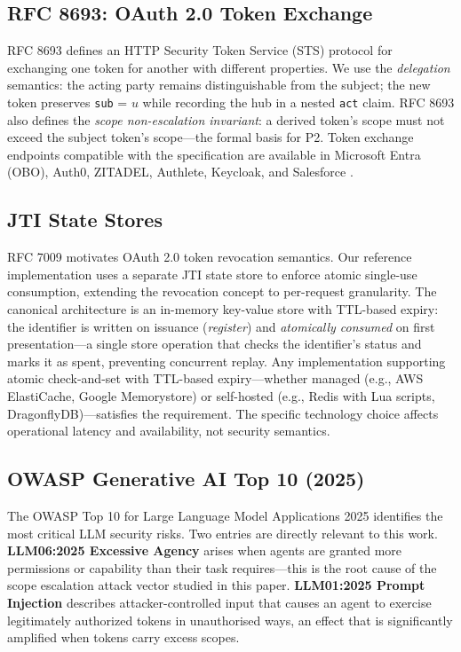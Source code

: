 \documentclass[journal]{IEEEtran}
\theoremstyle{definition}
\begin{document}
\subsection{RFC 8693: OAuth 2.0 Token Exchange}

RFC 8693 \cite{rfc8693} defines an HTTP Security Token Service (STS) protocol
for exchanging one token for another with different properties.
We use the \textit{delegation} semantics: the acting party remains
distinguishable from the subject; the new token preserves \texttt{sub} = $u$
while recording the hub in a nested \texttt{act} claim. RFC 8693 also defines
the \textit{scope non-escalation invariant}: a derived token's scope must not
exceed the subject token's scope---the formal basis for P2. Token exchange endpoints compatible with the specification are available in
Microsoft Entra (OBO), Auth0, ZITADEL, Authlete, Keycloak, and Salesforce
\cite{rfc8693_deploy}.

\subsection{JTI State Stores}

RFC 7009 \cite{rfc7009} motivates OAuth 2.0 token revocation semantics. Our
reference implementation uses a separate JTI state store to enforce atomic
single-use consumption, extending the revocation concept to per-request
granularity. The canonical architecture is an in-memory key-value store
with TTL-based expiry: the identifier is written on issuance
(\textit{register}) and \textit{atomically consumed} on first presentation---a
single store operation that checks the identifier's status and marks it as
spent, preventing concurrent replay.  Any implementation supporting atomic
check-and-set with TTL-based expiry---whether managed (e.g., AWS ElastiCache,
Google Memorystore) or self-hosted (e.g., Redis with Lua scripts,
DragonflyDB)---satisfies the requirement. The specific technology choice
affects operational latency and availability, not security semantics.

\subsection{OWASP Generative AI Top 10 (2025)}

The OWASP Top 10 for Large Language Model Applications 2025 \cite{owasp_genai}
identifies the most critical LLM security risks. Two entries are directly
relevant to this work. \textbf{LLM06:2025 Excessive Agency} arises when agents
are granted more permissions or capability than their task requires---this is the
root cause of the scope escalation attack vector studied in this paper.
\textbf{LLM01:2025 Prompt Injection} describes attacker-controlled input that
causes an agent to exercise legitimately authorized tokens in unauthorised ways,
an effect that is significantly amplified when tokens carry excess scopes.
\end{document}
